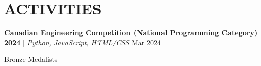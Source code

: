 \section{\textbf {\large ACTIVITIES}}
\resumeSubHeadingListStart

    \resumeProjectHeading
    {\textbf{Canadian Engineering Competition (National Programming Category) 2024} $|$ \emph{Python, JavaScript, HTML/CSS}}    {Mar 2024}
    
    {Bronze Medalists} {}
    \resumeItemListStart
        \resumeItem {}
        \resumeItem{}
        \resumeItem{}
    \resumeItemListEnd

\resumeSubHeadingListEnd